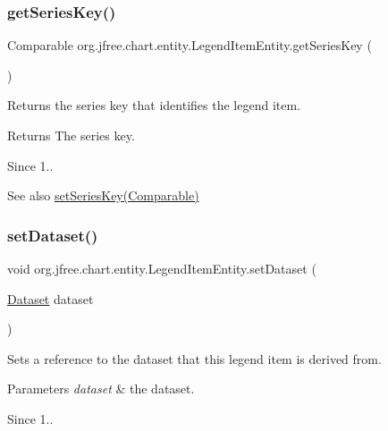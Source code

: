\subsubsection{\texorpdfstring{get\+Series\+Key()}{getSeriesKey()}}
{\footnotesize\ttfamily Comparable org.\+jfree.\+chart.\+entity.\+Legend\+Item\+Entity.\+get\+Series\+Key (\begin{DoxyParamCaption}{ }\end{DoxyParamCaption})}

Returns the series key that identifies the legend item.

\begin{DoxyReturn}{Returns}
The series key.
\end{DoxyReturn}
\begin{DoxySince}{Since}
1..
\end{DoxySince}
\begin{DoxySeeAlso}{See also}
\mbox{\hyperlink{classorg_1_1jfree_1_1chart_1_1entity_1_1_legend_item_entity_aad5679e1643d398bfd7f0eaed1a5d521}{set\+Series\+Key(\+Comparable)}} 
\end{DoxySeeAlso}
\mbox{\label{classorg_1_1jfree_1_1chart_1_1entity_1_1_legend_item_entity_aa00af89c7866832e592a4fef40785db3}} 
\subsubsection{\texorpdfstring{set\+Dataset()}{setDataset()}}
{\footnotesize\ttfamily void org.\+jfree.\+chart.\+entity.\+Legend\+Item\+Entity.\+set\+Dataset (\begin{DoxyParamCaption}\item[{\mbox{\hyperlink{interfaceorg_1_1jfree_1_1data_1_1general_1_1_dataset}{Dataset}}}]{dataset }\end{DoxyParamCaption})}

Sets a reference to the dataset that this legend item is derived from.


\begin{DoxyParams}{Parameters}
{\em dataset} & the dataset.\\
\hline
\end{DoxyParams}
\begin{DoxySince}{Since}
1.. 
\end{DoxySince}
\mbox{\label{classorg_1_1jfree_1_1chart_1_1entity_1_1_legend_item_entity_ab4fa4fb654292b30900965b21e4f904b}} 

